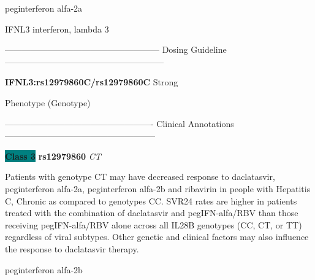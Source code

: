 \documentclass{resume} %
\begin{document}
\begin{rSection}{ peginterferon alfa-2a }
\begin{rSubsection}{ IFNL3 }{ interferon, lambda 3 }{}{}
\item[]
\item[] ------------------------------------------------------ Dosing Guideline --------------------------------------------------------\newline
\item[] \textbf{ IFNL3:rs12979860C/rs12979860C } Strong
\item[] Phenotype (Genotype)\newline
\item[] 
\item[] ---------------------------------------------------- Clinical Annotations -----------------------------------------------------\newline
\item \textbf{\colorbox{teal} {Class 3}} \textbf{ rs12979860 } \textit{ CT }
\item[] Patients with genotype CT may have decreased response to daclatasvir, peginterferon alfa-2a, peginterferon alfa-2b and ribavirin in people with Hepatitis C, Chronic as compared to genotypes CC. SVR24 rates are higher in patients treated with the combination of daclatasvir and pegIFN-alfa/RBV than those receiving pegIFN-alfa/RBV alone across all IL28B genotypes (CC, CT, or TT) regardless of viral subtypes. Other genetic and clinical factors may also influence the response to daclatasvir therapy.
\end{rSubsection}

\end{rSection}\begin{rSection}{ peginterferon alfa-2b }
\item[]


\end{rSection}
\end{document}
